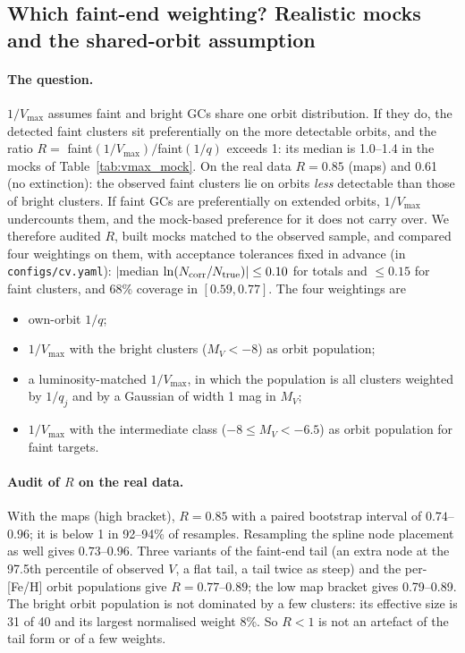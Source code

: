 \documentclass[11pt,a4paper]{article}
\newcommand{\MV}{M_V}
\begin{document}
\subsection{Which faint-end weighting? Realistic mocks and the shared-orbit assumption}
\label{sec:faint}

\paragraph{The question.} $1/V_{\max}$ assumes faint and bright GCs share one orbit distribution. If they
do, the detected faint clusters sit preferentially on the more detectable orbits, and the ratio
$R = $ faint$(1/V_{\max})/$faint$(1/q)$ exceeds 1: its median is 1.0--1.4 in the mocks of
Table~\ref{tab:vmax_mock}. On the real data $R = 0.85$ (maps) and 0.61 (no extinction): the observed
faint clusters lie on orbits \emph{less} detectable than those of bright clusters. If faint GCs are
preferentially on extended orbits, $1/V_{\max}$ undercounts them, and the mock-based preference for it
does not carry over. We therefore audited $R$, built mocks matched to the observed sample, and
compared four weightings on them, with acceptance tolerances fixed in advance (in
\texttt{configs/cv.yaml}): $|$median $\ln(N_{\rm corr}/N_{\rm true})| \le 0.10$ for totals and
$\le0.15$ for faint clusters, and 68\% coverage in $[0.59, 0.77]$. The four weightings are
\begin{itemize}
\item own-orbit $1/q$;
\item $1/V_{\max}$ with the bright clusters ($\MV<-8$) as orbit population;
\item a luminosity-matched $1/V_{\max}$, in which the population is all clusters weighted by
$1/q_j$ and by a Gaussian of width 1 mag in $\MV$;
\item $1/V_{\max}$ with the intermediate class ($-8\le\MV<-6.5$) as orbit population for faint targets.
\end{itemize}

\paragraph{Audit of $R$ on the real data.} With the maps (high bracket), $R = 0.85$ with a paired
bootstrap interval of $0.74$--$0.96$; it is below 1 in 92--94\% of resamples. Resampling the spline
node placement as well gives $0.73$--$0.96$. Three variants of the faint-end tail (an extra node at the
97.5th percentile of observed $V$, a flat tail, a tail twice as steep) and the per-[Fe/H] orbit
populations give $R = 0.77$--$0.89$; the low map bracket gives 0.79--0.89. The bright orbit population
is not dominated by a few clusters: its effective size is 31 of 40 and its largest normalised weight
8\%. So $R<1$ is not an artefact of the tail form or of a few weights.
\end{document}
